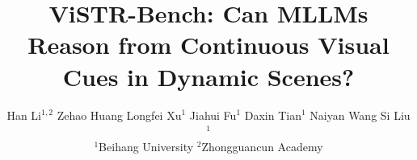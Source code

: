 \documentclass[10pt]{article}
\title{ViSTR-Bench: Can MLLMs Reason from Continuous Visual Cues in Dynamic Scenes?}
\author{%
  Han Li$^{1,2}$ \quad
  Zehao Huang \quad
  Longfei Xu$^{1}$ \quad
  Jiahui Fu$^{1}$ \quad
  Daxin Tian$^{1}$ \quad
  Naiyan Wang \quad
  Si Liu$^{1}$ \\[6pt]
  {\normalsize 
  $^{1}$Beihang University \quad $^{2}$Zhongguancun Academy} \\[3pt]
}
\begin{document}
\maketitle

\begin{colababstract}



\vspace{0.4cm}
\colablinks
\end{colababstract}

\vspace{0.4cm}














\end{document}
